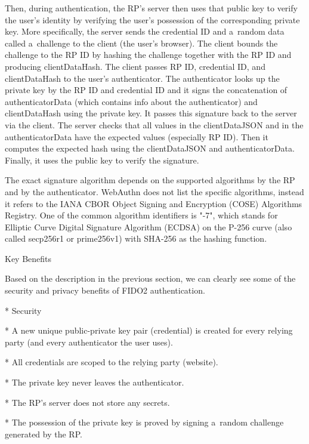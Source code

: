 Then, during {\sbf authentication}, the RP's server then uses that {\sbf public key} to verify the user's identity by verifying the user's possession of the corresponding private key. More specifically, the server sends the credential ID and a~random data called a~challenge to the client (the user's browser). The client bounds the challenge to the RP ID by hashing the challenge together with the RP ID and producing clientDataHash. The client passes RP ID, credential ID, and clientDataHash to the user's authenticator. The authenticator looks up the {\sbf private key} by the RP ID and credential ID and it signs the concatenation of authenticatorData (which contains info about the authenticator) and clientDataHash using the {\sbf private key}. It passes this signature back to the server via the client. The server checks that all values in the clientDataJSON and in the authenticatorData have the expected values (especially RP ID). Then it computes the expected hash using the clientDataJSON and authenticatorData. Finally, it uses the {\sbf public key} to verify the signature.

The exact signature algorithm depends on the supported algorithms by the RP and by the authenticator. WebAuthn does not list the specific algorithms, instead it refers to the IANA CBOR Object Signing and Encryption (COSE) Algorithms Registry. One of the common algorithm identifiers is "-7", which stands for Elliptic Curve Digital Signature Algorithm (ECDSA) on the P-256 curve (also called secp256r1 or prime256v1) with SHA-256 as the hashing function.


\sec Key Benefits

Based on the description in the previous section, we can clearly see some of the security and privacy benefits of FIDO2 authentication.

\begitems

* {\sbf Security}

\begitems

* A new unique public-private key pair (credential) is created for every relying party (and every authenticator the user uses).

* All credentials are scoped to the relying party (website).

* The private key never leaves the authenticator.

* The RP's server does not store any secrets.

* The possession of the private key is proved by signing a~random challenge generated by the RP.

